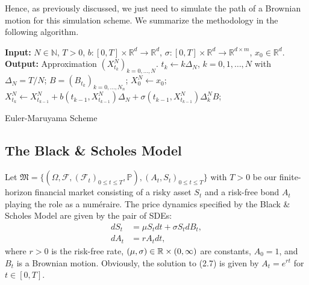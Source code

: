 Hence, as previously discussed, we just need to simulate the path of a Brownian motion for this simulation scheme. We summarize the methodology in the following algorithm.
\begin{algorithm}[H] 
\SetAlgoLined
    \textbf{Input:} $N\in\mathbb{N}$, $T>0$, $b:[0,T]\times \mathbb{R}^{d}\to\mathbb{R}^{d}$, $\sigma:[0,T]\times\mathbb{R}^{d}\to\mathbb{R}^{d\times m}$, $x_{0}\in\mathbb{R}^{d}$.\newline
    \textbf{Output:} Approximation $(X_{t_k}^{N})_{k=0,\dots,N}.$\newline
    $t_{k}\gets k\Delta_{N}$, $k=0,1,\dots,N$ with $\Delta_{N}=T/N$; \newline
    $B=(B_{t_k})_{k=0,\dots,N_{n}}$;\newline
    $X_0^{N}\gets x_0$;\newline
        {$X_{t_k}^{N}\gets X_{t_{k-1}}^{N} + b(t_{k-1},X_{t_{k-1}}^{N})\Delta_{N} + \sigma(t_{k-1},X_{t_{k-1}}^{N})\Delta_{k}^{N}B$;}
\caption{Euler-Maruyama Scheme}
\label{alg:euler}
\end{algorithm}

\subsection{The Black \& Scholes Model}\label{sec:BSM}
Let $\mathfrak{M}=\{(\Omega,\mathcal{F},(\mathcal{F}_{t})_{0\leq t\leq T},\mathbb{P}), (A_{t},S_{t})_{0\leq t\leq T}\}$ with $T>0$ be our finite-horizon financial market consisting of a risky asset $S_{t}$ and a risk-free bond $A_{t}$ playing the role as a numéraire. The price dynamics specified by the Black \& Scholes Model are given by the pair of SDEs:
\begin{align}
    dS_{t}&=\mu S_{t}dt+\sigma S_{t}dB_{t},\\
    dA_{t}&=rA_{t}dt,
\end{align}
where $r>0$ is the risk-free rate, $(\mu,\sigma)\in\mathbb{R}\times (0,\infty)$ are constants, $A_{0}=1$, and $B_t$ is a Brownian motion. Obviously, the solution to (2.7) is given by $A_{t}=e^{rt}$ for $t\in [0,T]$.

